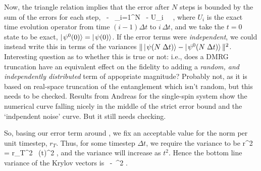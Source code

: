 \documentclass{article}
\newcommand{\norm}[1]{\Vert\,#1\,\Vert}
\begin{document}
Now, the triangle relation implies that the error after $N$ steps is bounded by
the sum of the errors for each step,
\beq
\norm{ - }
\leq 
\sum_{i=1}^N
\norm{ 
- U_i \, \ket{\psi^0((i-1)\Delta t)}} \; ,
\label{eq:sumerrors}
\eeq
where $U_i$ is the exact time evolution operator from time $(i-1)\Delta t$ to
$i \, \Delta t$, and we take the $t=0$ state to be exact, $\hbox{$\mid \! {\psi^0(0)} \rangle$} = \hbox{$\mid \! {\psi(0)} \rangle$}$.
If the error terms were \emph{independent}, we could instead write this in terms
of the variances $\norm{\ket{\psi(N \; \Delta t)} - \ket{\psi^0(N \; \Delta t)}}^2$.
Interesting question as to whether this is true or not: i.e., does a DMRG truncation have an
equivalent effect on the fidelity to adding a \emph{random, and independently distributed} 
term of appopriate magnitude? Probably not, as it is based on real-space truncation of the
entanglement which isn't random, but this needs to be checked. Results from Andreas for the
single-spin system show the numerical curve falling nicely in the middle of the strict error
bound and the `indpendent noise' curve. But it still needs checking.

So, basing our error term around , we fix an acceptable value for the
norm per unit timestep, $r_T$. Thus, for some timestep $\Delta t$, we require the variance
to be
\beq
r^2 = r_T^2 \, (\Delta t)^2 \; ,
\eeq
and the variance will increase as $t^2$.
Hence the bottom line variance of the Krylov vectors is
\beq
\norm{ - }^2 \leq 
{} \; .
\eeq
\end{document}
